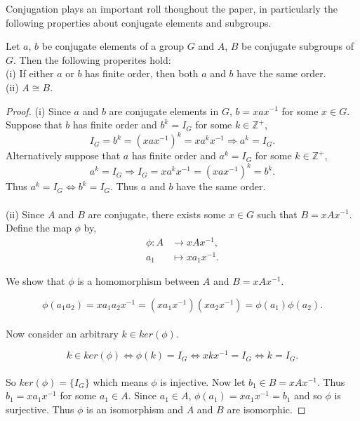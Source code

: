 \begin{definition}
Conjugation plays an important roll thoughout the paper, in particularly the following properties about conjugate elements and subgroups.

\begin{proposition}\label{conjugateprop} Let $a$, $b$ be conjugate elements of a group $G$ and $A$, $B$ be conjugate subgroups of $G$. Then the following properites hold: \vspace{3mm} \\
(i) If either $a$ or $b$ has finite order, then both $a$ and $b$ have the same order. \vspace{3mm} \\
(ii) $A \cong B$. \\
\end{proposition}

\begin{proof}
(i) Since $a$ and $b$ are conjugate elements in $G$, $b = xax^{-1}$ for some $x \in G$. Suppose that $b$ has finite order and $b^k = I_G$ for some $k \in \mathbb{Z}^+$,
\begin{equation*} I_G = b^k = (xax^{-1})^k = xa^{k}x^{-1} \Rightarrow a^k = I_G.
\end{equation*}
Alternatively suppose that $a$ has finite order and $a^k = I_G$ for some $k \in \mathbb{Z}^+$,
\begin{equation*} a^k = I_G \Rightarrow I_G = xa^{k}x^{-1} = (xax^{-1})^k = b^k.
\end{equation*}
Thus $a^k = I_G \iff b^k = I_G$. Thus $a$ and $b$ have the same order. \\
\\
(ii) Since $A$ and $B$ are conjugate, there exists some $x \in G$ such that $B=xAx^{-1}$. Define the map $\phi$ by,
\begin{align*}
\phi:A &\longrightarrow xAx^{-1}, \\
a_1 &\longmapsto xa_1x^{-1} \tag{$\forall \; a_1 \in A$}. \end{align*}

We show that $\phi$ is a homomorphism between $A$ and $B=xAx^{-1}$.

\begin{equation*}
\phi(a_1a_2) = xa_1a_2x^{-1} = ( xa_1x^{-1})( xa_2x^{-1}) = \phi(a_1) \phi(a_2).
\end{equation*}
\\
Now consider an arbitrary $k \in ker(\phi)$.

\begin{equation*}
k \in ker(\phi) \iff \phi(k) = I_G \iff  xkx^{-1} = I_G \iff k = I_G.
\end{equation*}
\\
So $ker(\phi) = \{ I_G \}$ which means $\phi$ is injective. Now let $b_1 \in B = xAx^{-1}$. Thus $b_1 = xa_1x^{-1}$ for some $a_1 \in A$. Since $a_1 \in A$, $\phi(a_1) = xa_1x^{-1} = b_1$ and so $\phi$ is surjective. Thus $\phi$ is an isomorphism and $A$ and $B$ are isomorphic.


\end{proof}
\end{definition}
